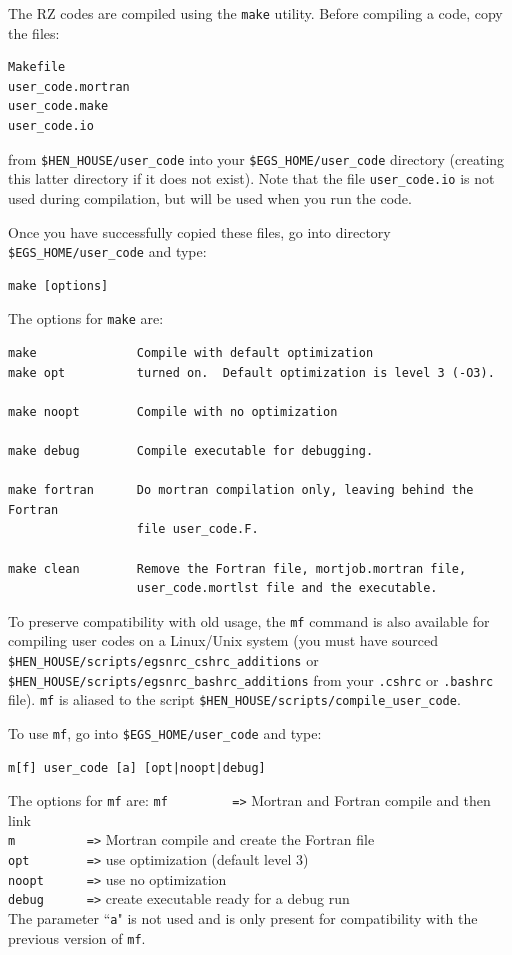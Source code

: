 \documentclass[12pt,twoside]{article}  %
\begin{document}
The RZ codes are compiled using the {\tt make} utility.  Before compiling
a code, copy the files:\\
\begin{verbatim}
Makefile
user_code.mortran
user_code.make 
user_code.io
\end{verbatim}
from {\tt \$HEN\_HOUSE/user\_code} into your {\tt \$EGS\_HOME/user\_code}
directory (creating this latter directory if it does not exist).
Note that the file {\tt user\_code.io} is not used during compilation, but
will be used when you run the code.

Once you have successfully copied these files, go into 
directory {\tt \$EGS\_HOME/user\_code} and type:
\begin{verbatim}
make [options]
\end{verbatim}
The options for {\tt make} are:
\begin{verbatim}
make              Compile with default optimization
make opt          turned on.  Default optimization is level 3 (-O3).

make noopt        Compile with no optimization

make debug        Compile executable for debugging.

make fortran      Do mortran compilation only, leaving behind the Fortran
                  file user_code.F.

make clean        Remove the Fortran file, mortjob.mortran file,
                  user_code.mortlst file and the executable.
\end{verbatim}

To preserve compatibility with old usage, the {\tt mf} command is also
available for compiling user codes on a Linux/Unix system (you must have
sourced\\
{\tt \$HEN\_HOUSE/scripts/egsnrc\_cshrc\_additions} or\\
{\tt \$HEN\_HOUSE/scripts/egsnrc\_bashrc\_additions} from your
{\tt .cshrc} or {\tt .bashrc} file).  {\tt mf} is
aliased to the script {\tt \$HEN\_HOUSE/scripts/compile\_user\_code}.

To use {\tt mf}, go into {\tt \$EGS\_HOME/user\_code} and type:
\begin{verbatim}
m[f] user_code [a] [opt|noopt|debug]
\end{verbatim}
The options for {\tt mf} are:
\verb+mf         =>+ Mortran and Fortran compile and then link\\
\verb+m          =>+ Mortran compile and create the Fortran file\\
\verb+opt        =>+ use optimization (default level 3)\\
\verb+noopt      =>+ use no optimization\\
\verb+debug      =>+ create executable ready for a debug run\\
The parameter ``{\tt a}" is not used and is only present for compatibility
with the previous version of {\tt mf}.
\end{document}
